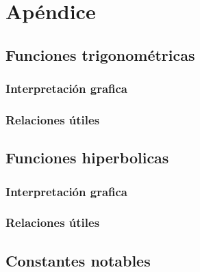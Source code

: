 \chapter{Apéndice}

\section{Funciones trigonométricas}
\subsection{Interpretación grafica}
\subsection{Relaciones útiles}
\section{Funciones hiperbolicas}
\subsection{Interpretación grafica}
\subsection{Relaciones útiles}

\section{Constantes notables}